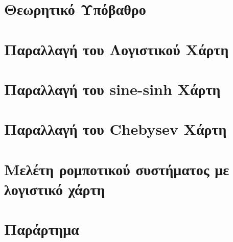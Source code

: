 \documentclass[a4paper,11pt]{report}
\begin{document}


\tableofcontents

\clearpage


\newpage
{}

\chapter{Θεωρητικό Υπόβαθρο}


\chapter{Παραλλαγή του Λογιστικού Χάρτη}
\label{chap:kef2}


\chapter{Παραλλαγή του sine-sinh Χάρτη}


\chapter{Παραλλαγή του Chebysev Χάρτη}


\chapter{Μελέτη ρομποτικού συστήματος με λογιστικό χάρτη}

\clearpage
\appendix

\chapter*{Παράρτημα}

\listoffigures
\listoftables
\end{document}
